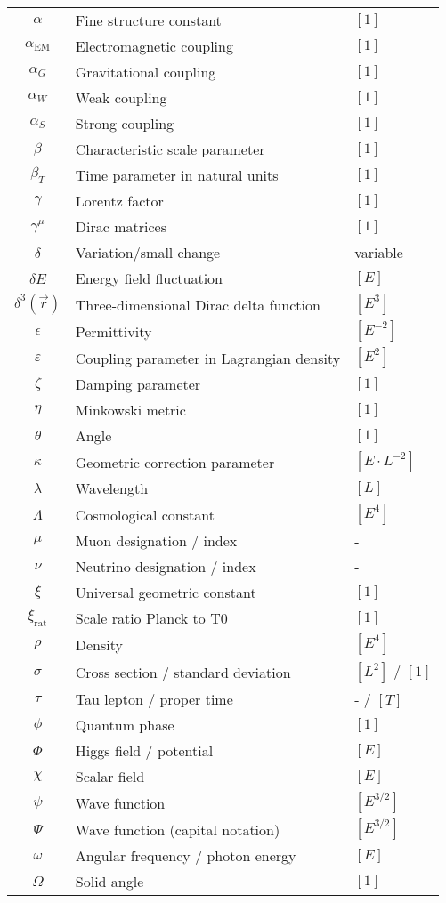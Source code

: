 \documentclass[12pt,a4paper]{report}
\begin{document}
\begin{longtable}{|c|l|l|}
	$\alpha$ & Fine structure constant & $[1]$ \\
	$\alpha_{\text{EM}}$ & Electromagnetic coupling & $[1]$ \\
	$\alpha_G$ & Gravitational coupling & $[1]$ \\
	$\alpha_W$ & Weak coupling & $[1]$ \\
	$\alpha_S$ & Strong coupling & $[1]$ \\
	$\beta$ & Characteristic scale parameter & $[1]$ \\
	$\beta_T$ & Time parameter in natural units & $[1]$ \\
	$\gamma$ & Lorentz factor & $[1]$ \\
	$\gamma^\mu$ & Dirac matrices & $[1]$ \\
	$\delta$ & Variation/small change & variable \\
	$\delta E$ & Energy field fluctuation & $[E]$ \\
	$\delta^3(\vec{r})$ & Three-dimensional Dirac delta function & $[E^3]$ \\
	$\epsilon$ & Permittivity & $[E^{-2}]$ \\
	$\varepsilon$ & Coupling parameter in Lagrangian density & $[E^2]$ \\
	$\zeta$ & Damping parameter & $[1]$ \\
	$\eta$ & Minkowski metric & $[1]$ \\
	$\theta$ & Angle & $[1]$ \\
	$\kappa$ & Geometric correction parameter & $[E \cdot L^{-2}]$ \\
	$\lambda$ & Wavelength & $[L]$ \\
	$\Lambda$ & Cosmological constant & $[E^4]$ \\
	$\mu$ & Muon designation / index & - \\
	$\nu$ & Neutrino designation / index & - \\
	$\xi$ & Universal geometric constant & $[1]$ \\
	$\xi_{\text{rat}}$ & Scale ratio Planck to T0 & $[1]$ \\
	$\rho$ & Density & $[E^4]$ \\
	$\sigma$ & Cross section / standard deviation & $[L^2]$ / $[1]$ \\
	$\tau$ & Tau lepton / proper time & - / $[T]$ \\
	$\phi$ & Quantum phase & $[1]$ \\
	$\Phi$ & Higgs field / potential & $[E]$ \\
	$\chi$ & Scalar field & $[E]$ \\
	$\psi$ & Wave function & $[E^{3/2}]$ \\
	$\Psi$ & Wave function (capital notation) & $[E^{3/2}]$ \\
	$\omega$ & Angular frequency / photon energy & $[E]$ \\
	$\Omega$ & Solid angle & $[1]$ \\
	\hline
\end{longtable}
\end{document}
